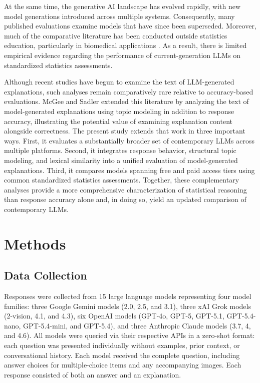 \documentclass[APA,LATO2COL]{WileyNJDv5}
\begin{document}
At the same time, the generative AI landscape has evolved rapidly, with new model generations introduced across multiple systems. Consequently, many published evaluations examine models that have since been superseded. Moreover, much of the comparative literature has been conducted outside statistics education, particularly in biomedical applications \cite{Nascimento2024LLM4DSEL}. As a result, there is limited empirical evidence regarding the performance of current-generation LLMs on standardized statistics assessments. 

Although recent studies have begun to examine the text of LLM-generated explanations, such analyses remain comparatively rare relative to accuracy-based evaluations. McGee and Sadler \cite{mcgeesadler2025} extended this literature by analyzing the text of model-generated explanations using topic modeling in addition to response accuracy, illustrating the potential value of examining explanation content alongside correctness. The present study extends that work in three important ways. First, it evaluates a substantially broader set of contemporary LLMs across multiple platforms. Second, it integrates response behavior, structural topic modeling, and lexical similarity into a unified evaluation of model-generated explanations. Third, it compares models spanning free and paid access tiers using common standardized statistics assessments. Together, these complementary analyses provide a more comprehensive characterization of statistical reasoning than response accuracy alone and, in doing so, yield an updated comparison of contemporary LLMs.

\section{Methods}\label{sec:methods}



\subsection{Data Collection}
\label{sec:data_collection}

Responses were collected from 15 large language models representing four
model families: three Google Gemini models (2.0, 2.5, and 3.1), three xAI
Grok models (2-vision, 4.1, and 4.3), six OpenAI models (\mbox{GPT-4o},
GPT-5, GPT-5.1, GPT-5.4-nano, GPT-5.4-mini, and GPT-5.4), and three
Anthropic Claude models (3.7, 4, and 4.6). All models were queried via
their respective APIs in a zero-shot format: each question was presented
individually without examples, prior context, or conversational history.
Each model received the complete question, including answer choices for multiple-choice items and any accompanying images. Each response consisted of both an answer and an explanation. 
\end{document}

